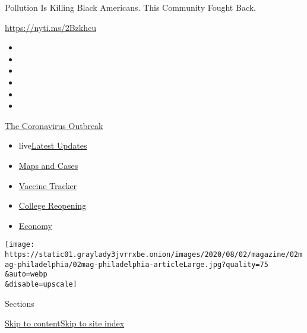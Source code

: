 Pollution Is Killing Black Americans. This Community Fought Back.

\url{https://nyti.ms/2Bzkhcu}

\begin{itemize}
\item
\item
\item
\item
\item
\item
\end{itemize}

\href{https://www.nytimes3xbfgragh.onion/news-event/coronavirus?action=click\&pgtype=Article\&state=default\&region=TOP_BANNER\&context=storylines_menu}{The
Coronavirus Outbreak}

\begin{itemize}
\tightlist
\item
  live\href{https://www.nytimes3xbfgragh.onion/2020/08/04/world/coronavirus-cases.html?action=click\&pgtype=Article\&state=default\&region=TOP_BANNER\&context=storylines_menu}{Latest
  Updates}
\item
  \href{https://www.nytimes3xbfgragh.onion/interactive/2020/us/coronavirus-us-cases.html?action=click\&pgtype=Article\&state=default\&region=TOP_BANNER\&context=storylines_menu}{Maps
  and Cases}
\item
  \href{https://www.nytimes3xbfgragh.onion/interactive/2020/science/coronavirus-vaccine-tracker.html?action=click\&pgtype=Article\&state=default\&region=TOP_BANNER\&context=storylines_menu}{Vaccine
  Tracker}
\item
  \href{https://www.nytimes3xbfgragh.onion/2020/08/02/us/covid-college-reopening.html?action=click\&pgtype=Article\&state=default\&region=TOP_BANNER\&context=storylines_menu}{College
  Reopening}
\item
  \href{https://www.nytimes3xbfgragh.onion/live/2020/08/04/business/stock-market-today-coronavirus?action=click\&pgtype=Article\&state=default\&region=TOP_BANNER\&context=storylines_menu}{Economy}
\end{itemize}

\texttt{[image: https://static01.graylady3jvrrxbe.onion/images/2020/08/02/magazine/02mag-philadelphia/02mag-philadelphia-articleLarge.jpg?quality=75\\\&auto=webp\\\&disable=upscale]}

Sections

\protect\hyperlink{site-content}{Skip to
content}\protect\hyperlink{site-index}{Skip to site index}

